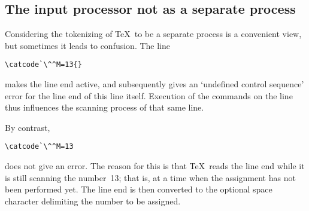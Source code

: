 \documentclass{book}
\begin{document}
\subsection{The input processor not as a separate process}

Considering the tokenizing of \TeX\ to be a separate process
is a convenient view, but sometimes it leads to confusion.
The line
\begin{verbatim}
\catcode`\^^M=13{}
\end{verbatim}
makes the line end active,
and subsequently gives an `undefined control sequence' error
for the line end of this line itself. Execution of the commands
on the line thus influences the scanning process of that
same line.

By contrast,
\begin{verbatim}
\catcode`\^^M=13
\end{verbatim}
does not give an error.
The reason for this is that \TeX\ reads the line end while it is still
scanning the number~13; that is, at a time when the assignment
has not been performed yet.
The line end is then converted to the optional space character
delimiting the number to be assigned.

\end{document}
